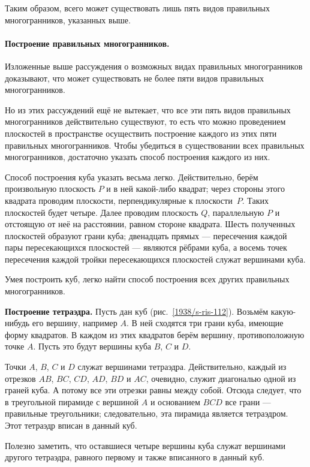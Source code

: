 {Таким образом, всего может существовать лишь пять видов правильных многогранников, указанных выше.

\paragraph{Построение правильных многогранников.}\label{1938/s98}
Изложенные выше рассуждения о возможных видах правильных многогранников доказывают, что может существовать не более пяти видов правильных многогранников.

Но из этих рассуждений ещё не вытекает, что все эти пять видов правильных многогранников действительно существуют, то есть что можно проведением плоскостей в пространстве осуществить построение каждого из этих пяти правильных многогранников.
Чтобы убедиться в существовании всех правильных многогранников, достаточно указать способ построения каждого из них.

Способ построения куба указать весьма легко.
Действительно, берём произвольную плоскость $P$ и в ней какой-либо квадрат;
через стороны этого квадрата проводим плоскости, перпендикулярные к плоскости~$P$.
Таких плоскостей будет четыре.
Далее проводим плоскость $Q$, параллельную $P$ и отстоящую от неё на расстоянии, равном стороне квадрата.
Шесть полученных плоскостей образуют грани куба;
двенадцать прямых — пересечения каждой пары пересекающихся плоскостей — являются рёбрами куба, а восемь точек пересечения каждой тройки пересекающихся плоскостей служат вершинами куба.

Умея построить куб, легко найти способ построения всех других правильных многогранников.

\textbf{Построение тетраэдра.}
Пусть дан куб (рис.~\ref{1938/s-ris-112}).
Возьмём какую-нибудь его вершину, например $A$.
В ней сходятся три грани куба, имеющие форму квадратов.
В каждом из этих квадратов берём вершину, противоположную точке $A$.
Пусть это будут вершины куба $B$, $C$ и $D$.

Точки $A$, $B$, $C$ и $D$ служат вершинами тетраэдра.
Действительно, каждый из отрезков $AB$, $BC$, $CD$, $AD$, $BD$ и $AC$, очевидно, служит диагональю одной из граней куба.
А потому все эти отрезки равны между собой.
Отсюда следует, что в треугольной пирамиде с вершиной $A$ и основанием $BCD$ все грани — правильные треугольники; следовательно, эта пирамида является тетраэдром.
Этот тетраэдр вписан в данный куб.



Полезно заметить, что оставшиеся четыре вершины куба служат вершинами другого тетраэдра, равного первому и также вписанного в данный куб.

}
